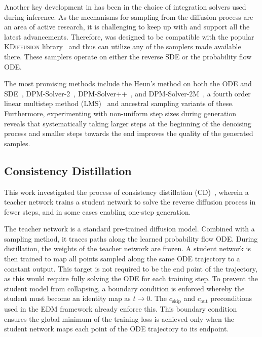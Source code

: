 Another key development in \pcdroid has been in the choice of integration solvers used during inference.
As the mechanisms for sampling from the diffusion process are an area of active research, it is challenging to keep up with and support all the latest advancements. Therefore, \pcdroid was designed to be compatible with the popular \textsc{KDiffusion} library~\cite{KDiffusion} and thus can utilize any of the samplers made available there.
These samplers operate on either the reverse SDE or the probability flow ODE.

The most promising methods include the Heun's method on both the ODE and SDE~\cite{ODEBook}, DPM-Solver-2~\cite{DPMSolverFastODE}, DPM-Solver++~\cite{DPMSolverFastSolver}, and DPM-Solver-2M~\cite{DPMSolverFastSolver}, a fourth order linear multistep method (LMS)~\cite{ODEBook} and ancestral sampling variants of these.
Furthermore, experimenting with non-uniform step sizes during generation reveals that systematically taking larger steps at the beginning of the denoising process and smaller steps towards the end improves the quality of the generated samples.

\subsection{Consistency Distillation}

This work investigated the process of consistency distillation (CD)~\cite{ConsistencyModels}, wherein a teacher network trains a student network to solve the reverse diffusion process in fewer steps, and in some cases enabling one-step generation.

The teacher network is a standard pre-trained diffusion model.
Combined with a sampling method, it traces paths along the learned probability flow ODE.
During distillation, the weights of the teacher network are frozen.
A student network is then trained to map all points sampled along the same ODE trajectory to a constant output.
This target is not required to be the end point of the trajectory, as this would require fully solving the ODE for each training step.
To prevent the student model from collapsing, a boundary condition is enforced whereby the student must become an identity map as $t \rightarrow 0$.
The $c_\text{skip}$ and $c_\text{out}$ preconditions used in the EDM framework already enforce this.
This boundary condition ensures the global minimum of the training loss is achieved only when the student network maps each point of the ODE trajectory to its endpoint.

